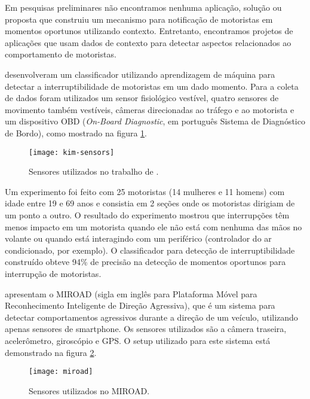 Em pesquisas preliminares não encontramos nenhuma aplicação, solução ou proposta que construiu um mecanismo para
notificação de motoristas em momentos oportunos utilizando contexto. Entretanto, encontramos projetos de aplicações que
usam dados de contexto para detectar aspectos relacionados ao comportamento de motoristas.

 desenvolveram um classificador utilizando aprendizagem de máquina para detectar a interruptibilidade
de motoristas em um dado momento. Para a coleta de dados foram utilizados um sensor fisiológico vestível, quatro sensores
de movimento também vestíveis, câmeras direcionadas ao tráfego e ao motorista e um dispositivo OBD (\textit{On-Board Diagnostic},
em português Sistema de Diagnóstico de Bordo), como mostrado na figura \ref{kim-sensors}.

\begin{figure}[h]
\centering
\texttt{[image: kim-sensors]}
\caption{Sensores utilizados no trabalho de .}
\label{kim-sensors}
\end{figure}

Um experimento foi feito com 25 motoristas (14 mulheres e 11 homens) com idade entre 19 e 69 anos e consistia em 2 seções
onde os motoristas dirigiam de um ponto a outro. O resultado do experimento mostrou que interrupções têm menos impacto em um motorista
quando ele não está com nenhuma das mãos no volante ou quando está interagindo com um periférico (controlador do ar condicionado, por exemplo).
O classificador para detecção de interruptibilidade construído obteve 94\% de precisão na detecção de momentos
oportunos para interrupção de motoristas.


 apresentam o MIROAD (sigla em inglês para Plataforma Móvel para Reconhecimento
Inteligente de Direção Agressiva), que é um sistema para detectar comportamentos agressivos durante a direção de um veículo, utilizando
apenas sensores de smartphone. Os sensores utilizados são a câmera traseira, acelerômetro, giroscópio e GPS. O setup utilizado para este
sistema está demonstrado na figura \ref{miroad}.

\begin{figure}[h]
\centering
\texttt{[image: miroad]}
\caption{Sensores utilizados no MIROAD. \cite{johnson2011driving}}
\label{miroad}
\end{figure}


